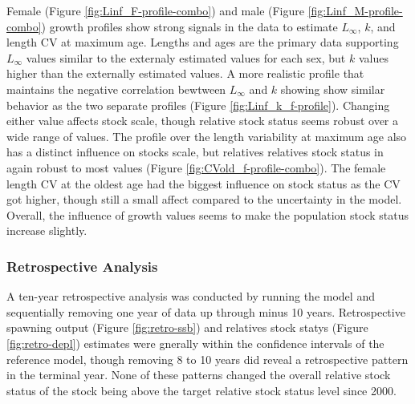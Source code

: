 \documentclass[11pt,
  english,
  a4paper,
]{article}
\begin{document}

Female (Figure \ref{fig:Linf_F-profile-combo}) and male (Figure \ref{fig:Linf_M-profile-combo}) growth profiles show strong signals in the data to estimate {\(L_{\infty}\)\leavevmode\tagmcend\tagstructend}, {\(k\)\leavevmode\tagmcend\tagstructend}, and length CV at maximum age. Lengths and ages are the primary data supporting {\(L_{\infty}\)\leavevmode\tagmcend\tagstructend} values similar to the externaly estimated values for each sex, but {\(k\)\leavevmode\tagmcend\tagstructend} values higher than the externally estimated values. A more realistic profile that maintains the negative correlation bewtween {\(L_{\infty}\)\leavevmode\tagmcend\tagstructend} and {\(k\)\leavevmode\tagmcend\tagstructend} showing show similar behavior as the two separate profiles (Figure \ref{fig:Linf_k_f-profile}). Changing either value affects stock scale, though relative stock status seems robust over a wide range of values. The profile over the length variability at maximum age also has a distinct influence on stocks scale, but relatives relatives stock status in again robust to most values (Figure \ref{fig:CVold_f-profile-combo}). The female length CV at the oldest age had the biggest influence on stock status as the CV got higher, though still a small affect compared to the uncertainty in the model. Overall, the influence of growth values seems to make the population stock status increase slightly.

\leavevmode\tagmcend\tagstructend\par


\hypertarget{retrospective-analysis}{%
\subsubsection{Retrospective Analysis}\label{retrospective-analysis}}

\leavevmode\tagmcend\tagstructend


A ten-year retrospective analysis was conducted by running the model and sequentially removing one year of data up through minus 10 years. Retrospective spawning output (Figure \ref{fig:retro-ssb}) and relatives stock statys (Figure \ref{fig:retro-depl}) estimates were gnerally within the confidence intervals of the reference model, though removing 8 to 10 years did reveal a retrospective pattern in the terminal year. None of these patterns changed the overall relative stock status of the stock being above the target relative stock status level since 2000.
\end{document}
